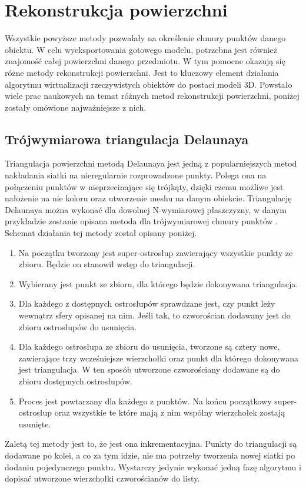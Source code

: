 \section{Rekonstrukcja powierzchni}
Wszystkie powyższe metody pozwalały na określenie chmury punktów danego obiektu. W celu wyeksportowania gotowego modelu, potrzebna jest również znajomość całej powierzchni danego przedmiotu. W tym pomocne okazują się różne metody rekonstrukcji powierzchni. Jest to kluczowy element działania algorytmu wirtualizacji rzeczywistych obiektów do postaci modeli 3D. Powstało wiele prac naukowych na temat różnych metod rekonstrukcji powierzchni, poniżej zostały omówione najważniejsze z nich.
\subsection{Trójwymiarowa triangulacja Delaunaya}
Triangulacja powierzchni metodą Delaunaya jest jedną z popularniejszych metod nakładania siatki na nieregularnie rozprowadzone punkty. Polega ona na połączeniu punktów w nieprzecinające się trójkąty, dzięki czemu możliwe jest nałożenie na nie koloru oraz utworzenie meshu na danym obiekcie. Triangulację Delaunaya można wykonać dla dowolnej N-wymiarowej płaszczyzny, w danym przykładzie zostanie opisana metoda dla trójwymiarowej chmury punktów \cite{cignoni1998dewall}. Schemat działania tej metody został opisany poniżej. 
\begin{enumerate}
    \item Na początku tworzony jest super-ostrosłup zawierający wszystkie punkty ze zbioru. Będzie on stanowił wstęp do triangulacji.
    \item Wybierany jest punkt ze zbioru, dla którego będzie dokonywana triangulacja.
    \item Dla każdego z dostępnych ostrosłupów sprawdzane jest, czy punkt leży wewnątrz sfery opisanej na nim. Jeśli tak, to czworościan dodawany jest do zbioru ostrosłupów do usunięcia.
    \item Dla każdego ostrosłupa ze zbioru do usunięcia, tworzone są cztery nowe, zawierające trzy wcześniejsze wierzchołki oraz punkt dla którego dokonywana jest triangulacja. W ten sposób utworzone czworościany dodawane są do zbioru dostępnych ostrosłupów.
    \item Proces jest powtarzany dla każdego z punktów.
    \Item Na końcu początkowy super-ostrosłup oraz wszystkie te które mają z nim wspólny wierzchołek zostają usunięte.
\end{enumerate}
Zaletą tej metody jest to, że jest ona inkrementacyjna. Punkty do triangulacji są dodawane po kolei, a co za tym idzie, nie ma potrzeby tworzenia nowej siatki po dodaniu pojedynczego punktu. Wystarczy jedynie wykonać jedną fazę algorytmu i dopisać utworzone wierzchołki czworościanów do listy.
